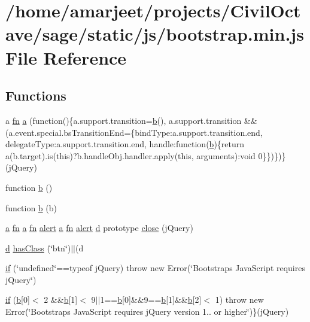 \hypertarget{a00029}{}\section{/home/amarjeet/projects/\+Civil\+Octave/sage/static/js/bootstrap.min.\+js File Reference}
\label{a00029}
\subsection*{Functions}
\begin{DoxyCompactItemize}
\item 
a \hyperlink{a00030_ab2836ee14921cbd6e34ea91a9a99ad66}{fn} \hyperlink{a00029_a1f5870dcf487187f13d5fd328ed9e6e7}{a} (function()\{a.\+support.\+transition=\hyperlink{a00029_a398bb8542498d1b14178b02b99df309b}{b}(), a.\+support.\+transition \&\&(a.\+event.\+special.\+bs\+Transition\+End=\{bind\+Type\+:a.\+support.\+transition.\+end, delegate\+Type\+:a.\+support.\+transition.\+end, handle\+:function(\hyperlink{a00029_a398bb8542498d1b14178b02b99df309b}{b})\{return a(b.\+target).is(this)?b.\+handle\+Obj.\+handler.\+apply(this, arguments)\+:void 0\}\})\})\}(j\+Query)
\item 
function \hyperlink{a00029_a7c192e47b11481e4717b9f1e04eb4420}{b} ()
\item 
function \hyperlink{a00029_a398bb8542498d1b14178b02b99df309b}{b} (b)
\item 
\hyperlink{a00029_a1f5870dcf487187f13d5fd328ed9e6e7}{a} \hyperlink{a00030_ab2836ee14921cbd6e34ea91a9a99ad66}{fn} \hyperlink{a00029_a1f5870dcf487187f13d5fd328ed9e6e7}{a} \hyperlink{a00030_ab2836ee14921cbd6e34ea91a9a99ad66}{fn} \hyperlink{a00029_aaa41eef066735d697e7786ec86d52389}{alert} \hyperlink{a00029_a1f5870dcf487187f13d5fd328ed9e6e7}{a} \hyperlink{a00030_ab2836ee14921cbd6e34ea91a9a99ad66}{fn} \hyperlink{a00029_aaa41eef066735d697e7786ec86d52389}{alert} \hyperlink{a00029_aeb337d295abaddb5ec3cb34cc2e2bbc9}{d} prototype \hyperlink{a00029_afaca3a961d693f40135a872e93e71198}{close} (j\+Query)
\item 
\hyperlink{a00029_aeb337d295abaddb5ec3cb34cc2e2bbc9}{d} \hyperlink{a00029_afa9eb56c756985e9715e3820fd044aa3}{has\+Class} (\char`\"{}btn\char`\"{})$\vert$$\vert$(d
\item 
\hyperlink{a00029_ac2d69f5011896c6ed4a54e0dd36f6334}{if} (\char`\"{}undefined\char`\"{}==typeof j\+Query) throw new Error(\char`\"{}Bootstrap\textquotesingle{}s Java\+Script requires j\+Query\char`\"{})
\item 
\hyperlink{a00029_a87cf461060832b8b68a7b48d9e371e4f}{if} (\hyperlink{a00029_a398bb8542498d1b14178b02b99df309b}{b}\mbox{[}0\mbox{]}$<$ 2 \&\&\hyperlink{a00029_a398bb8542498d1b14178b02b99df309b}{b}\mbox{[}1\mbox{]}$<$ 9$\vert$$\vert$1==\hyperlink{a00029_a398bb8542498d1b14178b02b99df309b}{b}\mbox{[}0\mbox{]}\&\&9==\hyperlink{a00029_a398bb8542498d1b14178b02b99df309b}{b}\mbox{[}1\mbox{]}\&\&\hyperlink{a00029_a398bb8542498d1b14178b02b99df309b}{b}\mbox{[}2\mbox{]}$<$ 1) throw new Error(\char`\"{}Bootstrap\textquotesingle{}s Java\+Script requires j\+Query version 1.. or higher\char`\"{})\}(j\+Query)
\end{DoxyCompactItemize}
